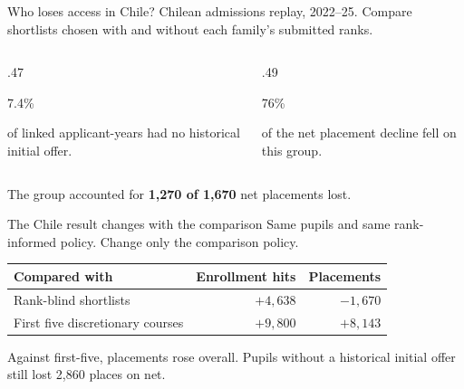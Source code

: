 \documentclass[aspectratio=169,14pt]{beamer}
\begin{document}
\begin{frame}{Who loses access in Chile?}
{\small Chilean admissions replay, 2022--25. Compare shortlists chosen with and without each family's submitted ranks.}
\bigskip
\begin{columns}[T,onlytextwidth]
\begin{column}{.47\textwidth}
{\LARGE 7.4\%\par}
of linked applicant-years had no historical initial offer.
\end{column}
\begin{column}{.49\textwidth}
{\LARGE\color{rust}76\%\par}
of the net placement decline fell on this group.
\end{column}
\end{columns}
\bigskip
The group accounted for \textbf{1,270 of 1,670} net placements lost.
\end{frame}

\begin{frame}{The Chile result changes with the comparison}
{\small Same pupils and same rank-informed policy. Change only the comparison policy.}
\medskip
\small
\renewcommand{\arraystretch}{1.4}
\begin{tabularx}{\textwidth}{@{}Xrr@{}}
\toprule
Compared with & Enrollment hits & Placements\\\midrule
Rank-blind shortlists & $+4,638$ & $-1,670$\\
First five discretionary courses & $+9,800$ & $+8,143$\\
\bottomrule
\end{tabularx}
\par\medskip
\normalsize
Against first-five, placements rose overall. Pupils without a historical initial offer still lost \alert{2,860 places on net}.
\end{frame}
\end{document}
